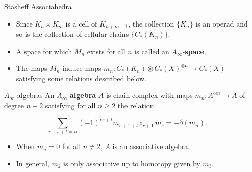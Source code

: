 \documentclass[final]{beamer}
\newlength{\sepwid}
\newlength{\onecolwid}
\begin{document}
\begin{frame}[t]
\begin{columns}[t]
\begin{column}{\onecolwid}
\begin{block}{Stasheff Associahedra}
      \begin{itemize}
          \item Since $K_n\times K_m$ is a cell of $K_{n+m-1}$, the collection $\{K_n\}$ is an operad and so is the collection of cellular chains $\{C_*(K_n)\}$.
          \item A space for which $M_n$ exists for all $n$ is called an $A_\infty$-\textbf{space}.
          \item The maps $M_n$ induce maps $m_n:C_*(K_n)\otimes C_*(X)^{\otimes n}\to C_*(X)$ satisfying some relations described below.
      \end{itemize}
          \end{block}
          
          
          \begin{block}{$A_\infty$-algebras}
          An $A_\infty$-\textbf{algebra} $A$ is chain complex with maps $m_n:A^{\otimes n}\to A$ of degree $n-2$ satisfying for all $n\geq 2$ the relation

\[\sum_{r+s+t=n}(-1)^{rs+t}m_{r+1+t}\circ_{r+1} m_s=-\partial(m_n).\]

\begin{itemize}
    \item When $m_n=0$ for all $n\neq 2$, $A$ is an associative algebra.
    \item In general, $m_2$ is only associative up to homotopy given by $m_3$.
\end{itemize}


          
          

          \end{block}
          
            
          
         
          
         \end{column}
                  
                  
                  
         \begin{column}{\sepwid}  \end{column}
         

\end{columns}
\end{frame}
\end{document}
